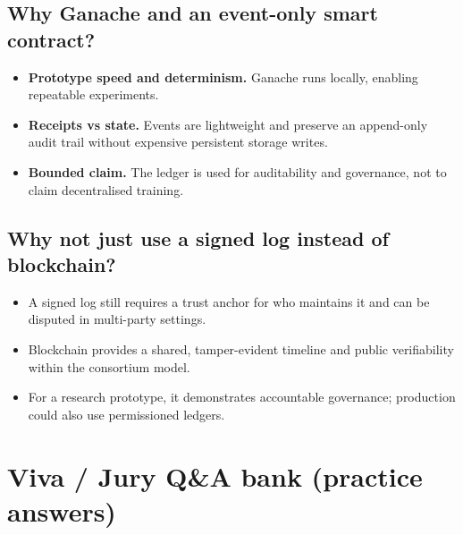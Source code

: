 \documentclass[11pt,a4paper]{article}
\begin{document}
\subsection{Why Ganache and an event-only smart contract?}
\begin{itemize}
\item \textbf{Prototype speed and determinism.} Ganache runs locally, enabling repeatable experiments.
\item \textbf{Receipts vs state.} Events are lightweight and preserve an append-only audit trail without expensive persistent storage writes.
\item \textbf{Bounded claim.} The ledger is used for auditability and governance, not to claim decentralised training.
\end{itemize}

\subsection{Why not just use a signed log instead of blockchain?}
\begin{itemize}
\item A signed log still requires a trust anchor for who maintains it and can be disputed in multi-party settings.
\item Blockchain provides a shared, tamper-evident timeline and public verifiability within the consortium model.
\item For a research prototype, it demonstrates accountable governance; production could also use permissioned ledgers.
\end{itemize}

\newpage
\section{Viva / Jury Q\&A bank (practice answers)}
\end{document}
